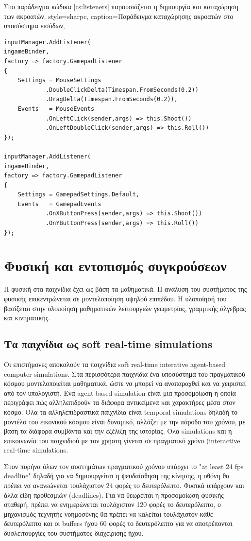 	\newpage
	Στο παράδειγμα κώδικα \ref{cs:listeners} παρουσιάζεται η δημιουργία και καταχώρηση των ακροατών. 
	\lstset
	{		
		style=sharpc, 
		caption={Παράδειγμα καταχώρησης ακροατών στο υποσύστημα εισόδων},
	}
	\begin{lstlisting}[label=cs:listeners]
inputManager.AddListener(
ingameBinder,
factory => factory.GamepadListener
{
	Settings = MouseSettings
		    .DoubleClickDelta(Timespan.FromSeconds(0.2))
			.DragDelta(Timespan.FromSeconds(0.2)),
	Events   = MouseEvents
	        .OnLeftClick(sender,args) => this.Shoot())
	        .OnLeftDoubleClick(sender,args) => this.Roll())      	
});

inputManager.AddListener(
ingameBinder,
factory => factory.GamepadListener
{
	Settings = GamepadSettings.Default,
	Events   = GamepadEvents
			.OnXButtonPress(sender,args) => this.Shoot())
			.OnYButtonPress(sender,args) => this.Roll())      	
});
\end{lstlisting}

\section{Φυσική και εντοπισμός συγκρούσεων}
Η φυσική στα παιχνίδια έχει ως βάση τα μαθηματικά. Η ανάλυση του συστήματος της φυσικής επικεντρώνεται σε μοντελοποίηση υψηλού επιπέδου. Η υλοποίησή του βασίζεται στην υλοποίηση μαθηματικών λειτουργιών γεωμετρίας, γραμμικής άλγεβρας και κινηματικής.

\subsection{Τα παιχνίδια ως soft real-time simulations}
Οι επιστήμονες αποκαλούν τα παιχνίδια soft real-time interative agent-based computer simulations.
Στα περισσότερα παιχνίδια ένα υποσύστημα του πραγματικού κόσμου μοντελοποιείται μαθηματικά, ώστε να μπορεί να αναπαραχθεί και να χειριστεί από τον υπολογιστή. 
Ενα agent-based simulation είναι μια προσομοίωση η οποία περιγράφει πώς αλληλεπιδρούν τα διάφορα αντικείμενα και χαρακτήρες μέσα στον κόσμο.
Όλα τα αλληλεπιδραστικά παιχνίδια είναι temporal simulations δηλαδή το μοντέλο του εικονικού κόσμου είναι δυναμικό, αλλάζει με την πάροδο του χρόνου, με βάση τα διάφορα συμβάντα και την εξέλιξη της ιστορίας.
Όλα simulations και η επικοινωνία του παιχνιδιού με τον χρήστη γίνεται σε πραγματικό χρόνο (interactive real-time simulations. 

Στον πυρήνα όλων τον συστημάτων πραγματικού χρόνου υπάρχει το "at least 24 fps deadline" δηλαδή για να δημιουργείται η ψευδαίσθηση της κίνησης, η οθόνη θα πρέπει να ανανεώνεται τουλάχιστον 24 φορές το δευτερόλεπτο. Φυσικά υπάρχουν και άλλα είδη προθεσμιών (deadlines). Για να θεωρείται η προσομοίωση φυσικής σταθερή, πρέπει να ενημερώνεται τουλάχιστον 120 φορές το δευτερόλεπτο, ο μηχανισμός τεχνητής νοημοσύνης θα πρέπει να καλείται τουλάχιστον κάθε δευτερόλεπτο και οι buffers ήχου 60 φορές το δευτερόλεπτο για να αποτρέπονται δυσλειτουργίες του συστήματος διαχείρισης ήχου.


